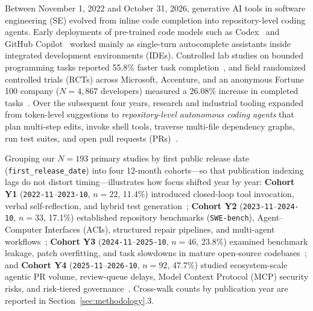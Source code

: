 \documentclass[10pt,twocolumn,a4paper]{article}
\makeatletter
\renewcommand\section{\@startsection{section}{1}{\z@}{-2.8ex \@plus -0.6ex \@minus -0.2ex}{1.4ex \@plus 0.2ex}{\normalfont\Large\bfseries\raggedright}}
\makeatother
\begin{document}
\section{Introduction}
\label{sec:intro}

Between November 1, 2022 and October 31, 2026, generative AI tools in software engineering (SE) evolved from inline code completion into repository-level coding agents. Early deployments of pre-trained code models such as Codex~\cite{chen2021evaluating} and GitHub Copilot~\cite{vaithilingam2022expectation,dakhel2023github,ziegler2024measuring} worked mainly as single-turn autocomplete assistants inside integrated development environments (IDEs). Controlled lab studies on bounded programming tasks reported 55.8\% faster task completion~\cite{peng2023impact}, and field randomized controlled trials (RCTs) across Microsoft, Accenture, and an anonymous Fortune 100 company ($N=4,867$ developers) measured a 26.08\% increase in completed tasks~\cite{cui2026effects}. Over the subsequent four years, research and industrial tooling expanded from token-level suggestions to \emph{repository-level autonomous coding agents} that plan multi-step edits, invoke shell tools, traverse multi-file dependency graphs, run test suites, and open pull requests (PRs)~\cite{jimenez2024swebench,yang2024sweagent,wang2025openhands,li2026aidev}.

Grouping our $N=193$ primary studies by first public release date (\texttt{first\_release\_date}) into four 12-month cohorts---so that publication indexing lags do not distort timing---illustrates how focus shifted year by year: \textbf{Cohort Y1} (\texttt{2022-11}--\texttt{2023-10}, $n=22$, 11.4\%) introduced closed-loop tool invocation, verbal self-reflection, and hybrid test generation~\cite{yao2023react,schick2023toolformer,shinn2023reflexion,lemieux2023codamosa}; \textbf{Cohort Y2} (\texttt{2023-11}--\texttt{2024-10}, $n=33$, 17.1\%) established repository benchmarks (\texttt{SWE-bench}), Agent--Computer Interfaces (ACIs), structured repair pipelines, and multi-agent workflows~\cite{jimenez2024swebench,yang2024sweagent,xia2024demystifying,hong2024metagpt,qian2024chatdev}; \textbf{Cohort Y3} (\texttt{2024-11}--\texttt{2025-10}, $n=46$, 23.8\%) examined benchmark leakage, patch overfitting, and task slowdowns in mature open-source codebases~\cite{yu2025utboost,wang2025solved,rondon2025evaluating,watanabe2025use,becker2025measuring}; and \textbf{Cohort Y4} (\texttt{2025-11}--\texttt{2026-10}, $n=92$, 47.7\%) studied ecosystem-scale agentic PR volume, review-queue delays, Model Context Protocol (MCP) security risks, and risk-tiered governance~\cite{li2026aidev,adams2026automating,gong2026analyzing,oukhay2026code,chowdhury2026industry,arora2026specifying}. Cross-walk counts by publication year are reported in Section~\ref{sec:methodology}.3.
\end{document}
